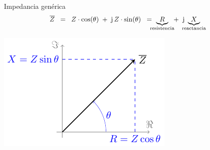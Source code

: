 \documentclass[aspectratio=169, usenames,svgnames,dvipsnames]{beamer}
\begin{document}

\begin{frame}{Impedancia genérica}
    \vspace{3mm}
    \[
    \overline{Z} \;\; = \;\; Z\cdot\cos(\theta) \; + \; \mathrm{j}\,Z\cdot\sin(\theta) \;\; = \hspace{-2mm} \underbrace{R}_\text{resistencia}\hspace{-1mm} + \;\; \mathrm{j} \hspace{-2mm}\underbrace{X}_\text{reactancia}
    \]
    
    \vspace{-3mm}

    \hspace{30mm}
    \includegraphics[height=0.65\textheight]{../figs/fasorImpedancia.pdf}

\end{frame}

\end{document}

